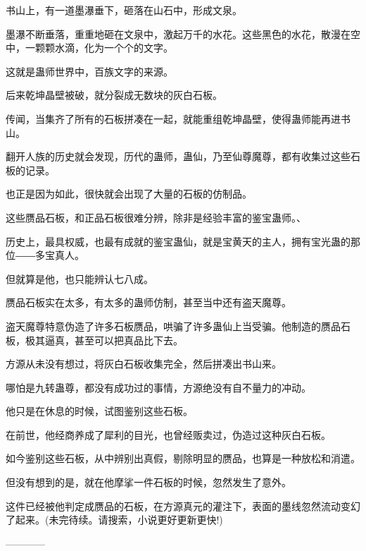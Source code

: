 \begin{this_body}
书山上，有一道墨瀑垂下，砸落在山石中，形成文泉。

墨瀑不断垂落，重重地砸在文泉中，激起万千的水花。这些黑色的水花，散漫在空中，一颗颗水滴，化为一个个的文字。

这就是蛊师世界中，百族文字的来源。

后来乾坤晶壁被破，就分裂成无数块的灰白石板。

传闻，当集齐了所有的石板拼凑在一起，就能重组乾坤晶壁，使得蛊师能再进书山。

翻开人族的历史就会发现，历代的蛊师，蛊仙，乃至仙尊魔尊，都有收集过这些石板的记录。

也正是因为如此，很快就会出现了大量的石板的仿制品。

这些赝品石板，和正品石板很难分辨，除非是经验丰富的鉴宝蛊师。、

历史上，最具权威，也最有成就的鉴宝蛊仙，就是宝黄天的主人，拥有宝光蛊的那位――多宝真人。

但就算是他，也只能辨认七八成。

赝品石板实在太多，有太多的蛊师仿制，甚至当中还有盗天魔尊。

盗天魔尊特意伪造了许多石板赝品，哄骗了许多蛊仙上当受骗。他制造的赝品石板，极其逼真，甚至可以把真品比下去。

方源从未没有想过，将灰白石板收集完全，然后拼凑出书山来。

哪怕是九转蛊尊，都没有成功过的事情，方源绝没有自不量力的冲动。

他只是在休息的时候，试图鉴别这些石板。

在前世，他经商养成了犀利的目光，也曾经贩卖过，伪造过这种灰白石板。

如今鉴别这些石板，从中辨别出真假，剔除明显的赝品，也算是一种放松和消遣。

但没有想到的是，就在他摩挲一件石板的时候，忽然发生了意外。

这件已经被他判定成赝品的石板，在方源真元的灌注下，表面的墨线忽然流动变幻了起来。(未完待续。请搜索，小说更好更新更快!)

------------

\end{this_body}

